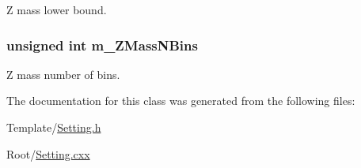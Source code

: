 Z mass lower bound. 

\hypertarget{classTemplateMethod_1_1Setting_a5173097d228f32cad8f0aacd5f8b19ae}{
\subsubsection[{m\+\_\+\+Z\+Mass\+N\+Bins}]{\setlength{\rightskip}{0pt plus 5cm}unsigned int m\+\_\+\+Z\+Mass\+N\+Bins\hspace{0.3cm}{\ttfamily [private]}}}\label{classTemplateMethod_1_1Setting_a5173097d228f32cad8f0aacd5f8b19ae}


Z mass number of bins. 



The documentation for this class was generated from the following files\+:\begin{DoxyCompactItemize}
\item 
Template/\hyperlink{Setting_8h}{Setting.\+h}\item 
Root/\hyperlink{Setting_8cxx}{Setting.\+cxx}\end{DoxyCompactItemize}
